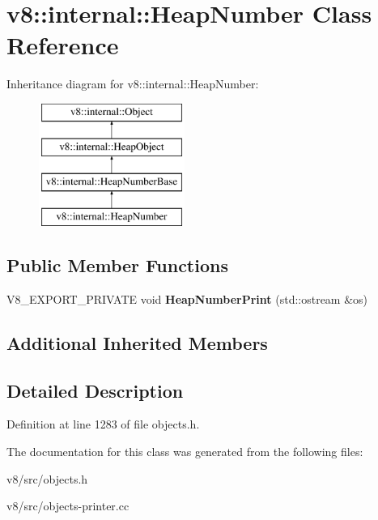 \hypertarget{classv8_1_1internal_1_1HeapNumber}{}\section{v8\+:\+:internal\+:\+:Heap\+Number Class Reference}
\label{classv8_1_1internal_1_1HeapNumber}
Inheritance diagram for v8\+:\+:internal\+:\+:Heap\+Number\+:\begin{figure}[H]
\begin{center}
\leavevmode
\includegraphics[height=4.000000cm]{classv8_1_1internal_1_1HeapNumber}
\end{center}
\end{figure}
\subsection*{Public Member Functions}
\begin{DoxyCompactItemize}
\item 
\mbox{\label{classv8_1_1internal_1_1HeapNumber_a505e3c19a10517e2743a51f28be2bbfa}} 
V8\+\_\+\+E\+X\+P\+O\+R\+T\+\_\+\+P\+R\+I\+V\+A\+TE void {\bfseries Heap\+Number\+Print} (std\+::ostream \&os)
\end{DoxyCompactItemize}
\subsection*{Additional Inherited Members}


\subsection{Detailed Description}


Definition at line 1283 of file objects.\+h.



The documentation for this class was generated from the following files\+:\begin{DoxyCompactItemize}
\item 
v8/src/objects.\+h\item 
v8/src/objects-\/printer.\+cc\end{DoxyCompactItemize}
